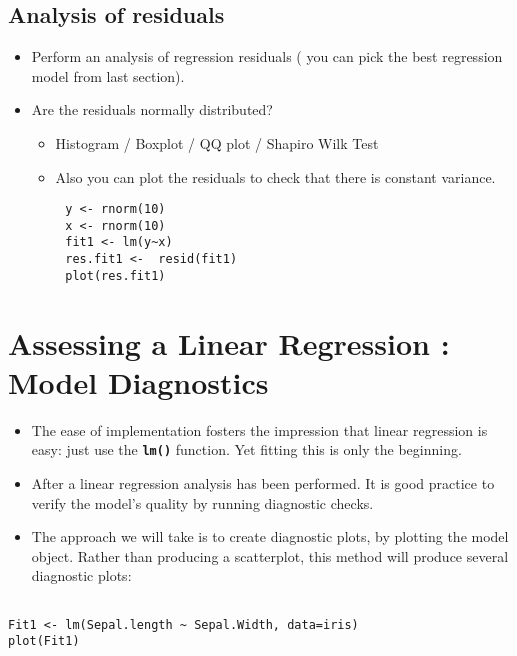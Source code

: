 \documentclass[a4paper,12pt]{article}
\begin{document}
\Large
		\subsection*{Analysis of residuals}
		\begin{itemize}
		\item	Perform an analysis of regression residuals ( you can pick the best regression model from last section).
		\item	Are the residuals normally distributed?
		\begin{itemize}
			\item Histogram /  Boxplot / QQ plot / Shapiro Wilk Test
			\item Also you can plot the residuals to check that there is constant variance.
		\end{itemize}	
		\end{itemize}
	
	\begin{framed}
		\begin{verbatim}
		y <- rnorm(10)
		x <- rnorm(10)
		fit1 <- lm(y~x)
		res.fit1 <-  resid(fit1)
		plot(res.fit1)
		\end{verbatim}
     \end{framed}		
\newpage
\section{Assessing a Linear Regression :  Model Diagnostics}
\begin{itemize}
\item The ease of implementation fosters the impression that linear regression is easy: just use the \texttt{\textbf{lm()}} function. Yet fitting
this is only the beginning.

\item After a linear regression analysis has been performed. It is good practice to verify the model’s quality
by running diagnostic checks.

\item The approach we will take is to create diagnostic plots, by plotting the model object. Rather than producing a scatterplot, this method will produce several diagnostic plots:
\end{itemize}


\begin{framed}
\begin{verbatim}

Fit1 <- lm(Sepal.length ~ Sepal.Width, data=iris)
plot(Fit1)
\end{verbatim} 
\end{framed}
\end{document}
